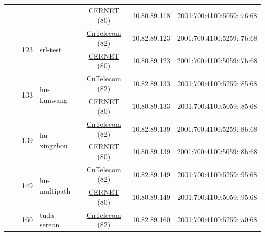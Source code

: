 \begin{small}
\begin{center}
\begin{longtable}{|c|c|c|c|c|c|c|c|}
  &  &  &  & \multicolumn{2}{|c|}{\tiny{\href{http://www.cernet.edu.cn}{CERNET} (80)}} & \tiny{10.80.89.118} & \tiny{2001:700:4100:5059::76:68} \\* \cline{3-3}\cline{4-4}\cline{5-5}\cline{6-6}\cline{7-7}\cline{8-8}
  &  & \multirow{2}{*}{\tiny{123}} & \multicolumn{1}{|l|}{\multirow{2}{*}{\tiny{srl-test}}} & \multicolumn{2}{|c|}{\tiny{\href{http://www.chinatelecom.com.cn}{CnTelecom} (82)}} & \tiny{10.82.89.123} & \tiny{2001:700:4100:5259::7b:68} \\* \cline{5-5}\cline{6-6}\cline{7-7}\cline{8-8}
  &  &  &  & \multicolumn{2}{|c|}{\tiny{\href{http://www.cernet.edu.cn}{CERNET} (80)}} & \tiny{10.80.89.123} & \tiny{2001:700:4100:5059::7b:68} \\* \cline{3-3}\cline{4-4}\cline{5-5}\cline{6-6}\cline{7-7}\cline{8-8}
  &  & \multirow{2}{*}{\tiny{133}} & \multicolumn{1}{|l|}{\multirow{2}{*}{\tiny{hu-kunwang}}} & \multicolumn{2}{|c|}{\tiny{\href{http://www.chinatelecom.com.cn}{CnTelecom} (82)}} & \tiny{10.82.89.133} & \tiny{2001:700:4100:5259::85:68} \\* \cline{5-5}\cline{6-6}\cline{7-7}\cline{8-8}
  &  &  &  & \multicolumn{2}{|c|}{\tiny{\href{http://www.cernet.edu.cn}{CERNET} (80)}} & \tiny{10.80.89.133} & \tiny{2001:700:4100:5059::85:68} \\* \cline{3-3}\cline{4-4}\cline{5-5}\cline{6-6}\cline{7-7}\cline{8-8}
  &  & \multirow{2}{*}{\tiny{139}} & \multicolumn{1}{|l|}{\multirow{2}{*}{\tiny{hu-xingzhou}}} & \multicolumn{2}{|c|}{\tiny{\href{http://www.chinatelecom.com.cn}{CnTelecom} (82)}} & \tiny{10.82.89.139} & \tiny{2001:700:4100:5259::8b:68} \\* \cline{5-5}\cline{6-6}\cline{7-7}\cline{8-8}
  &  &  &  & \multicolumn{2}{|c|}{\tiny{\href{http://www.cernet.edu.cn}{CERNET} (80)}} & \tiny{10.80.89.139} & \tiny{2001:700:4100:5059::8b:68} \\* \cline{3-3}\cline{4-4}\cline{5-5}\cline{6-6}\cline{7-7}\cline{8-8}
  &  & \multirow{2}{*}{\tiny{149}} & \multicolumn{1}{|l|}{\multirow{2}{*}{\tiny{hu-multipath}}} & \multicolumn{2}{|c|}{\tiny{\href{http://www.chinatelecom.com.cn}{CnTelecom} (82)}} & \tiny{10.82.89.149} & \tiny{2001:700:4100:5259::95:68} \\* \cline{5-5}\cline{6-6}\cline{7-7}\cline{8-8}
  &  &  &  & \multicolumn{2}{|c|}{\tiny{\href{http://www.cernet.edu.cn}{CERNET} (80)}} & \tiny{10.80.89.149} & \tiny{2001:700:4100:5059::95:68} \\* \cline{3-3}\cline{4-4}\cline{5-5}\cline{6-6}\cline{7-7}\cline{8-8}
  &  & \multirow{2}{*}{\tiny{160}} & \multicolumn{1}{|l|}{\multirow{2}{*}{\tiny{tuda-sereon}}} & \multicolumn{2}{|c|}{\tiny{\href{http://www.chinatelecom.com.cn}{CnTelecom} (82)}} & \tiny{10.82.89.160} & \tiny{2001:700:4100:5259::a0:68} \\* \cline{5-5}\cline{6-6}\cline{7-7}\cline{8-8}

\end{longtable}
\end{center}
\end{small}
